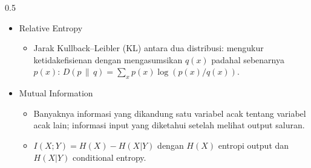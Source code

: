 \begin{frame}
\begin{columns}[T]
        \begin{column}{0.5\textwidth}
            \begin{itemize}\tiny\justifying
                \item Relative Entropy \cite{wolfowitz2012coding}
                    \begin{itemize}
                        \item[$\Rightarrow$] Jarak Kullback--Leibler (KL) antara
                            dua distribusi: mengukur ketidakefisienan dengan
                            mengasumsikan $q(x)$ padahal sebenarnya $p(x)$:
                            $D(p\,\|\,q)=\sum_x p(x)\log\!\left(p(x)/q(x)\right)$.
                    \end{itemize}
                \item Mutual Information \cite{djordjevic2019physical}
                    \begin{itemize}
                        \item[$\Rightarrow$] Banyaknya informasi yang dikandung
                            satu variabel acak tentang variabel acak lain;
                            informasi input yang diketahui setelah melihat
                            output saluran.
                        \item[$\Rightarrow$] $I(X;Y)=H(X)-H(X|Y)$ dengan $H(X)$
                            entropi output dan $H(X|Y)$ conditional entropy.
                    \end{itemize}
            \end{itemize}
        \end{column}
    \end{columns}
\end{frame}

